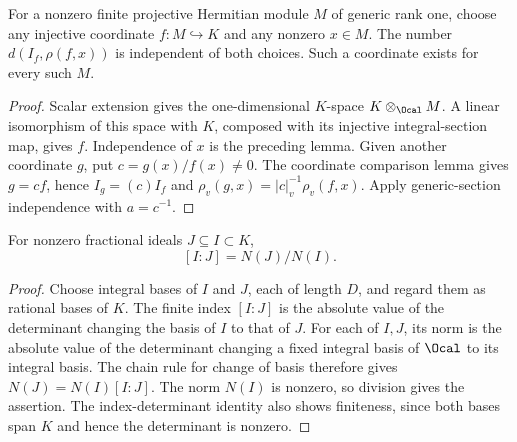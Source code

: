 \begin{lemma}
\label{lem:intrinsic-line-degree}
\leanok
For a nonzero finite projective Hermitian module $M$ of generic rank one,
choose any injective coordinate $f:M\hookrightarrow K$ and any nonzero
$x\in M$. The number $d(I_f,\rho(f,x))$ is independent of both choices.
Such a coordinate exists for every such $M$.
\end{lemma}
\begin{proof}
Scalar extension gives the one-dimensional $K$-space
$K\otimes_{\Ocal}M$. A linear isomorphism of this space with $K$, composed
with its injective integral-section map, gives $f$. Independence of $x$
is the preceding lemma. Given another coordinate $g$, put
$c=g(x)/f(x)\ne0$. The coordinate comparison lemma gives $g=cf$, hence
$I_g=(c)I_f$ and $\rho_v(g,x)=|c|_v^{-1}\rho_v(f,x)$.
Apply generic-section independence with $a=c^{-1}$.
\end{proof}

\begin{lemma}
\label{lem:fractional-ideal-index}
\leanok
For nonzero fractional ideals $J\subseteq I\subset K$,
\[
 [I:J]=N(J)/N(I).
\]
\end{lemma}
\begin{proof}
Choose integral bases of $I$ and $J$, each of length $D$, and regard them
as rational bases of $K$. The finite index $[I:J]$ is the absolute value
of the determinant changing the basis of $I$ to that of $J$. For each of
$I,J$, its norm is the absolute value of the determinant changing a fixed
integral basis of $\Ocal$ to its integral basis. The chain rule for change
of basis therefore gives $N(J)=N(I)[I:J]$. The norm $N(I)$ is nonzero,
so division gives the assertion. The index-determinant identity also
shows finiteness, since both bases span $K$ and hence the determinant
is nonzero.
\end{proof}

